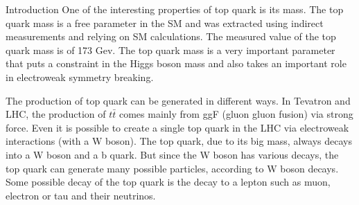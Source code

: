 \begin{chapter}{Introduction}
One of the interesting properties of top quark is its mass.
The top quark mass is a free parameter in the SM and was extracted using indirect measurements and relying on SM calculations. The measured value of the top quark mass is of 173 Gev\cite{pd}. The top quark mass is a very important
parameter that puts a constraint in the Higgs boson mass and also takes an important role in electroweak symmetry breaking\cite{top}.

The production of top quark can be generated in different ways. In Tevatron and LHC, the production of $t\bar{t}$ comes mainly from ggF (gluon gluon fusion) via strong force. Even it is possible to create a single top quark in the LHC via electroweak interactions (with a W boson)\cite{th1}. 
The top quark, due to its big mass, always decays into a W boson and a b quark. But since the W boson has various decays, the top quark can generate many possible particles, according to W boson decays. Some possible decay of the top quark is the decay to a lepton such as muon, electron or tau and their neutrinos. %


\end{chapter}
